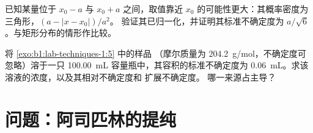 \begin{exercise}[$\star\star\star$]\label{exo:b1:lab-techniques-1:11}
已知某量位于 $x_0 - a$ 与 $x_0 + a$ 之间，取值靠近
$x_0$ 的可能性更大：其概率密度为三角形，$(a - |x - x_0|)/a^2$。
验证其已归一化，并证明其标准不确定度为
$a/\sqrt6$。与矩形分布的情形作比较。
\end{exercise}

\begin{exercise}[$\star\star\star$]\label{exo:b1:lab-techniques-1:12}
将 \cref{exo:b1:lab-techniques-1:5} 中的样品
（摩尔质量为 \qty{204.2}{g/mol}，不确定度可忽略）溶于一只
\qty{100.00}{mL} 容量瓶中，其容积的标准不确定度为
\qty{0.06}{mL}。求该溶液的浓度，以及其相对不确定度和
扩展不确定度。
哪一来源占主导？
\end{exercise}

\section{问题：阿司匹林的提纯}

